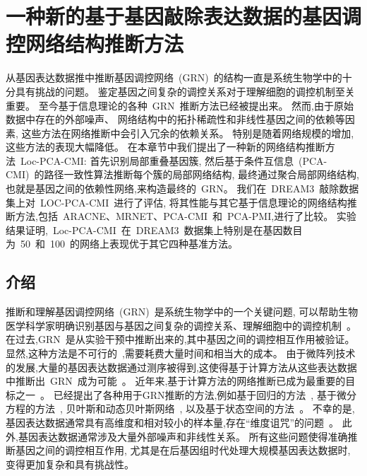 \section{一种新的基于基因敲除表达数据的基因调控网络结构推断方法}

从基因表达数据推中推断基因调控网络~(GRN)~的结构一直是系统生物学中的十分具有挑战的问题。
鉴定基因之间复杂的调控关系对于理解细胞的调控机制至关重要。
至今基于信息理论的各种~GRN~推断方法已经被提出来。
然而,由于原始数据中存在的外部噪声、
网络结构中的拓扑稀疏性和非线性基因之间的依赖等因素,
这些方法在网络推断中会引入冗余的依赖关系。
特别是随着网络规模的增加,这些方法的表现大幅降低。
在本章节中我们提出了一种新的网络结构推断方法~Loc-PCA-CMI:
首先识别局部重叠基因簇,
然后基于条件互信息~(PCA-CMI)~的路径一致性算法推断每个簇的局部网络结构,
最终通过聚合局部网络结构,也就是基因之间的依赖性网络,来构造最终的~GRN。
我们在~DREAM3~敲除数据集上对~LOC-PCA-CMI~进行了评估,
将其性能与其它基于信息理论的网络结构推断方法,包括~ARACNE、MRNET、PCA-CMI~和~PCA-PMI,进行了比较。
实验结果证明,~Loc-PCA-CMI~在~DREAM3~数据集上特别是在基因数目为~50~和~100~的网络上表现优于其它四种基准方法。

\subsection{介绍}

推断和理解基因调控网络~(GRN)~是系统生物学中的一个关键问题, 
可以帮助生物医学科学家明确识别基因与基因之间复杂的调控关系、理解细胞中的调控机制~\cite{altay2010inferring, basso2005reverse}。
在过去,GRN~是从实验干预中推断出来的,其中基因之间的调控相互作用被验证。
显然,这种方法是不可行的~\cite{elnitski2006locating},需要耗费大量时间和相当大的成本。
由于微阵列技术的发展,大量的基因表达数据通过测序被得到,这使得基于计算方法从这些表达数据中推断出~GRN~成为可能~\cite{maetschke2013supervised}。
近年来,基于计算方法的网络推断已成为最重要的目标之一~\cite{altay2010inferring, margolin2006reverse}。
已经提出了各种用于GRN推断的方法,例如基于回归的方法~\cite{Huynh-Thu2010, Haury2012, Huynh-Thu2014, liu2014group, li2017mgt, zheng2018bixgboost},
基于微分方程的方法~\cite{sakamoto2001inferring, chowdhury2015stochastic, li2011large},
贝叶斯和动态贝叶斯网络~\cite{murphy1999modelling, zou2004new, vinh2011globalmit, young2014fast, Liu2016, omranian2016gene},
以及基于状态空间的方法~\cite{wu2003modeling, quach2007estimating}。
不幸的是,基因表达数据通常具有高维度和相对较小的样本量,存在“维度诅咒”的问题~\cite{wang2006inferring}。
此外,基因表达数据通常涉及大量外部噪声和非线性关系。
所有这些问题使得准确推断基因之间的调控相互作用,
尤其是在后基因组时代处理大规模基因表达数据时,
变得更加复杂和具有挑战性。

